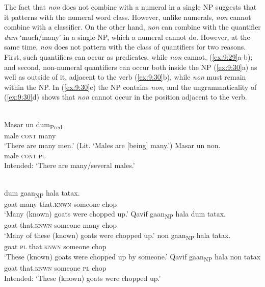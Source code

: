 The fact that \textit{non} does not combine with a numeral in a single NP suggests that it patterns with the numeral word class. However, unlike numerals, \textit{non} cannot combine with a classifier. On the other hand, \textit{non} can combine with the quantifier \textit{dum} `much/many' in a single NP, which a numeral cannot do. However, at the same time, \textit{non} does not pattern with the class of quantifiers for two reasons. First, such quantifiers can occur as predicates, while \textit{non} cannot, (\ref{ex:9:29}a-b); and second, non-numeral quantifiers can occur both inside the NP (\ref{ex:9:30}a) as well as outside of it, adjacent to the verb (\ref{ex:9:30}b), while \textit{non} must remain within the NP. In (\ref{ex:9:30}c) the NP contains \textit{non}, and the ungrammaticality of (\ref{ex:9:30}d) shows that \textit{non} cannot occur in the position adjacent to the verb.


\ea%
\label{ex:9:29}
 \\
\ea
\gll Masar {\ob}un dum{\cb}\textsubscript{\upshape Pred} \\
    male \textsc{cont} many \\
\glt  `There are many men.' (Lit. `Males are [being] many.')
\ex
\gll *Masar {\ob}un non{\cb}. \\
   male \textsc{cont} \textsc{pl}  \\
\glt  Intended: `There are many/several males.'
\z
\z







\ea%
\label{ex:9:30}
 \\
\ea
{} dum {ga}{{\textglotstop}}{an}{\cb}\textsubscript{\upshape NP} hala tatax. \\
   goat many that.\textsc{knwn} someone chop  \\
 \glt `Many (known) goats were chopped up.'
\ex
\gll {\ob}Qavif ga{{\textglotstop}}{an}{\cb}\textsubscript{\upshape NP} hala dum tatax. \\
   goat that.\textsc{knwn} someone many chop  \\
\glt `Many of these (known) goats were chopped up.'
\ex
{} non {ga}{{\textglotstop}}{an}{\cb}\textsubscript{\upshape NP} hala tatax. \\
   goat \textsc{pl} that.\textsc{knwn} someone chop  \\
\glt  `These (known) goats were chopped up by someone.'
\ex
\gll *{\ob}Qavif ga{{\textglotstop}}{an}{\cb}\textsubscript{\upshape NP} hala non tatax \\
   goat that.\textsc{knwn} someone \textsc{pl} chop  \\
\glt  Intended: `These (known) goats were chopped up.'
\z
\z


